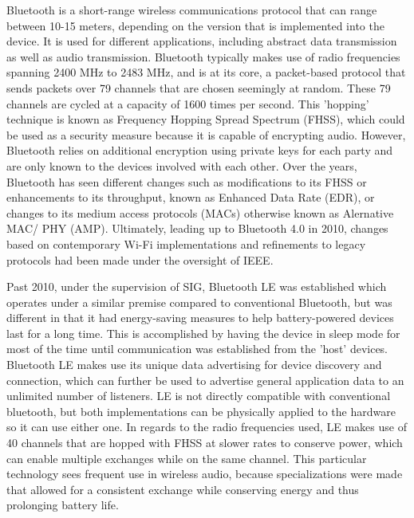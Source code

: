 \documentclass[conference]{IEEEtran}
\begin{document}
Bluetooth is a short-range wireless communications protocol that can range between 10-15
meters, depending on the version that is implemented into the device. It is used for
different applications, including abstract data transmission as well as audio transmission.
Bluetooth typically makes use of radio frequencies spanning 2400 MHz to 2483 MHz, and is at
its core, a packet-based protocol that sends packets over 79 channels that are chosen
seemingly at random. These 79 channels are cycled at a capacity of 1600 times per second.
This 'hopping' technique is known as Frequency Hopping Spread Spectrum (FHSS), which could be
used as a security measure because it is capable of encrypting audio. However, Bluetooth
relies on additional encryption using private keys for each party and are only known to the
devices involved with each other. Over the years, Bluetooth has seen different changes such
as modifications to its FHSS or enhancements to its throughput, known as Enhanced Data Rate
(EDR), or changes to its medium access protocols (MACs) otherwise known as Alernative MAC/
PHY (AMP). Ultimately, leading up to Bluetooth 4.0 in 2010, changes based on contemporary
Wi-Fi implementations and refinements to legacy protocols had been made under the oversight
of IEEE.\cite{noauthor_bluetooth_nodate}

Past 2010, under the supervision of SIG, Bluetooth LE was established which operates under a
similar premise compared to conventional Bluetooth, but was different in that it had
energy-saving measures to help battery-powered devices last for a long time. This is
accomplished by having the device in sleep mode for most of the time until communication was
established from the 'host' devices.\cite{bhalla_unraveling_2021} Bluetooth LE makes use its
unique data advertising for device discovery and connection, which can further be used to
advertise general application data to an unlimited number of listeners. LE is not directly
compatible with conventional bluetooth, but both implementations can be physically applied to
the hardware so it can use either one.\cite{bhalla_unraveling_2021} In regards to the radio
frequencies used, LE makes use of 40 channels that are hopped with FHSS at slower rates to
conserve power, which can enable multiple exchanges while on the same channel.
\cite{noauthor_bluetooth_nodate} This particular technology sees frequent use in wireless
audio, because specializations were made that allowed for a consistent exchange while
conserving energy and thus prolonging battery life.\cite{bhalla_unraveling_2021}
\end{document}
